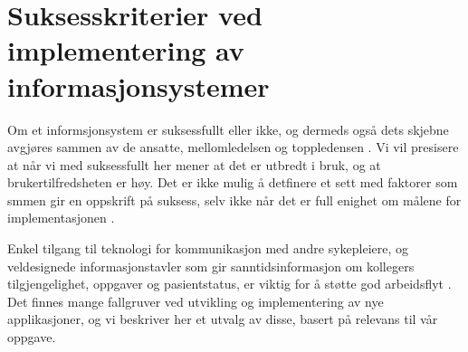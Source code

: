 \section{Suksesskriterier ved implementering av informasjonsystemer}
\label{chp: suksesskriterier}

Om et informsjonsystem er suksessfullt eller ikke, og dermeds også dets skjebne avgjøres sammen av de ansatte, mellomledelsen og toppledensen \cite{Berg01}. Vi vil presisere at når vi med suksessfullt her mener at det er utbredt i bruk, og at brukertilfredsheten er høy. Det er ikke mulig å detfinere et sett med faktorer som smmen gir en oppskrift på suksess, selv ikke når det er full enighet om målene for implementasjonen \cite{Berg01}.

\noindent
Enkel tilgang til teknologi for kommunikasjon med andre sykepleiere, og veldesignede informasjonstavler som gir sanntidsinformasjon om kollegers tilgjengelighet, oppgaver og pasientstatus, er viktig for å støtte god arbeidsflyt \cite{Ebright10}. 
Det finnes  mange fallgruver ved utvikling og implementering av nye applikasjoner, og vi beskriver her et utvalg av disse, basert på relevans til vår oppgave.


